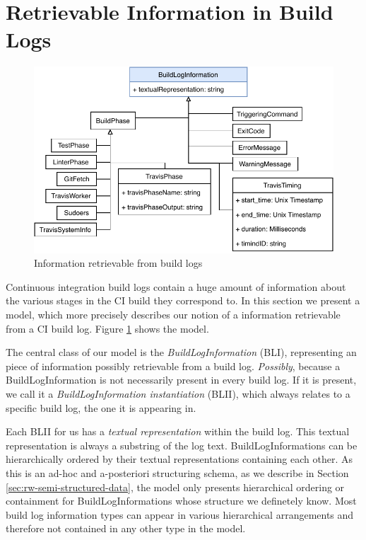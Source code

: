 \documentclass[\myrootdir/main.tex]{subfiles}
\begin{document}
\section{Retrievable Information in Build Logs}
\begin{figure}[h]
	\centering
	\includegraphics[width=\textwidth, clip]{img/build-log-information.pdf}
	\caption{Information retrievable from build logs}
	\label{fig:build-log-information}
\end{figure}
Continuous integration build logs contain a huge amount of information about the various stages in the CI build they correspond to.
In this section we present a model, which more precisely describes our notion of a information retrievable from a CI build log.
Figure \ref{fig:build-log-information} shows the model.

The central class of our model is the \emph{BuildLogInformation} (BLI), representing an piece of information possibly retrievable from a build log.
\emph{Possibly}, because a BuildLogInformation is not necessarily present in every build log.
If it is present, we call it a \emph{BuildLogInformation instantiation} (BLII), which always relates to a specific build log, the one it is appearing in.

Each BLII for us has a \emph{textual representation} within the build log.
This textual representation is always a substring of the log text.
BuildLogInformations can be hierarchically ordered by their textual representations containing each other.
As this is an ad-hoc and a-posteriori structuring schema, as we describe in Section \ref{sec:rw-semi-structured-data}, the model only presents hierarchical ordering or containment for BuildLogInformations whose structure we definetely know.
Most build log information types can appear in various hierarchical arrangements and therefore not contained in any other type in the model.
\end{document}
